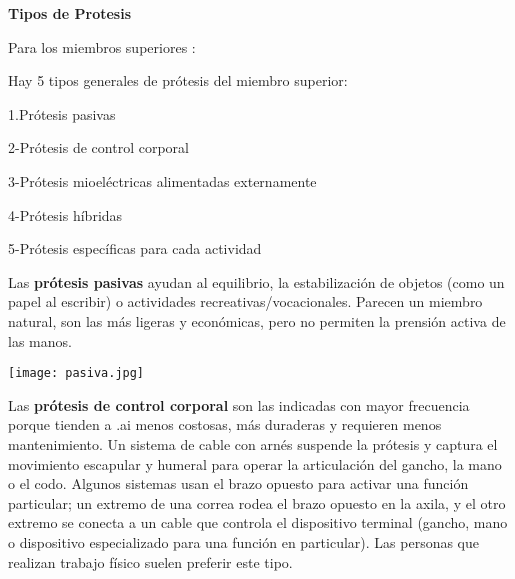 \documentclass{article}
\begin{document}
\hspace{1cm}

\textbf{Tipos de Protesis}

\hspace{1cm} 

Para los miembros superiores :

\hspace{1cm} 

Hay 5 tipos generales de prótesis del miembro superior:

\hspace{.5cm} 

1.Prótesis pasivas

\hspace{.5cm} 

2-Prótesis de control corporal

\hspace{.5cm} 

3-Prótesis mioeléctricas alimentadas externamente

\hspace{.5cm} 

4-Prótesis híbridas

\hspace{.5cm} 

5-Prótesis específicas para cada actividad


\hspace{1cm} 

Las \textbf {prótesis pasivas} ayudan al equilibrio, la estabilización de objetos (como un papel al escribir) o actividades recreativas/vocacionales. Parecen un miembro natural, son las más ligeras y económicas, pero no permiten la prensión activa de las manos.

\hspace{1cm} 

\begin{minipage}{.89\linewidth}
\centering
\texttt{[image: pasiva.jpg]}
\end{minipage}


\hspace{1cm} 

\hspace{.5cm} 

Las \textbf {prótesis de control corporal}  son las indicadas con mayor frecuencia porque tienden a .ai menos costosas, más duraderas y requieren menos mantenimiento. Un sistema de cable con arnés suspende la prótesis y captura el movimiento escapular y humeral para operar la articulación del gancho, la mano o el codo. Algunos sistemas usan el brazo opuesto para activar una función particular; un extremo de una correa rodea el brazo opuesto en la axila, y el otro extremo se conecta a un cable que controla el dispositivo terminal (gancho, mano o dispositivo especializado para una función en particular). Las personas que realizan trabajo físico suelen preferir este tipo.
\end{document}
